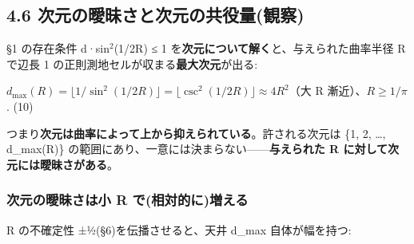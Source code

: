 \documentclass[
]{ltjsarticle}
\begin{document}
\subsection{4.6
次元の曖昧さと次元の共役量(観察)}\label{ux6b21ux5143ux306eux66d6ux6627ux3055ux3068ux6b21ux5143ux306eux5171ux5f79ux91cfux89b3ux5bdf}

§1 の存在条件 d·sin\(^{2}\)(1/2R) ≤ 1
を\textbf{次元について解く}と、与えられた曲率半径 R で辺長 1
の正則測地セルが収まる\textbf{最大次元}が出る:

\(d_{\max}(R) = \lfloor 1/\sin^2(1/2R)\rfloor = \lfloor \csc^2(1/2R)\rfloor \approx 4R^2\)（大
R 漸近）、\(R \ge 1/\pi\). (10)

つまり\textbf{次元は曲率によって上から抑えられている}。許される次元は
\{1, 2, \ldots, d\_max(R)\}
の範囲にあり、一意には決まらない------\textbf{与えられた R
に対して次元には曖昧さがある}。

\subsubsection{次元の曖昧さは小 R
で(相対的に)増える}\label{ux6b21ux5143ux306eux66d6ux6627ux3055ux306fux5c0f-r-ux3067ux76f8ux5bfeux7684ux306bux5897ux3048ux308b}

R の不確定性 ±½(§6)を伝播させると、天井 d\_max 自体が幅を持つ:
\end{document}
